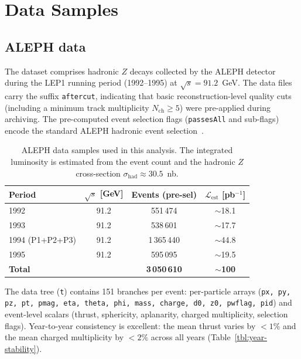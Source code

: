 \documentclass[11pt,a4paper]{article}
\begin{document}
\section{Data Samples}
\label{sec:data}

\subsection{ALEPH data}
\label{sec:data-aleph}

The dataset comprises hadronic $Z$ decays collected by the ALEPH
detector~\cite{ALEPH:1995aqm} during the LEP1 running period
(1992--1995) at $\sqrt{s} = 91.2$~GeV.  The data files carry the
suffix \texttt{aftercut}, indicating that basic reconstruction-level
quality cuts (including a minimum track multiplicity $N_\text{ch}
\ge 5$) were pre-applied during archiving.  The pre-computed event
selection flags (\texttt{passesAll} and sub-flags) encode the standard
ALEPH hadronic event selection~\cite{ALEPH:1998vtv,ALEPH:1999rgl}.

\begin{table}[htbp]
\centering
\caption{ALEPH data samples used in this analysis.  The integrated
  luminosity is estimated from the event count and the hadronic
  $Z$ cross-section $\sigma_\text{had} \approx 30.5$~nb.}
\label{tbl:data}
\begin{tabular}{lccc}
\toprule
Period & $\sqrt{s}$ [GeV] & Events (pre-sel) &
  $\mathcal{L}_\text{est}$ [pb$^{-1}$] \\
\midrule
1992 & 91.2 & 551\,474 & $\sim$18.1 \\
1993 & 91.2 & 538\,601 & $\sim$17.7 \\
1994 (P1+P2+P3) & 91.2 & 1\,365\,440 & $\sim$44.8 \\
1995 & 91.2 & 595\,095 & $\sim$19.5 \\
\midrule
\textbf{Total} & & \textbf{3\,050\,610} & $\sim$\textbf{100} \\
\bottomrule
\end{tabular}
\end{table}

The data tree (\texttt{t}) contains 151 branches per event: per-particle
arrays (\texttt{px, py, pz, pt, pmag, eta, theta, phi, mass, charge,
d0, z0, pwflag, pid}) and event-level scalars (thrust, sphericity,
aplanarity, charged multiplicity, selection flags).  Year-to-year
consistency is excellent: the mean thrust varies by $<\!1\%$ and the
mean charged multiplicity by $<\!2\%$ across all years
(Table~\ref{tbl:year-stability}).
\end{document}
